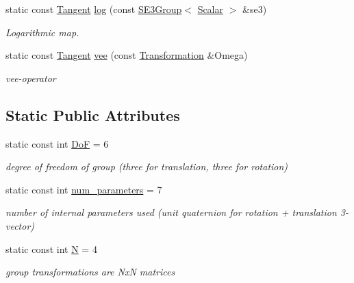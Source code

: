 \begin{DoxyCompactItemize}
static const \hyperlink{class_sophus_1_1_s_e3_group_base_a45f63b562f0614853cef2c04c4cd5f2b}{Tangent} \hyperlink{class_sophus_1_1_s_e3_group_base_a72dbbc415aacf31de17c3390c1b3ca6a}{log} (const \hyperlink{class_sophus_1_1_s_e3_group}{S\+E3\+Group}$<$ \hyperlink{class_sophus_1_1_s_e3_group_base_aa3db86a2cabe32d3c299dda41af181cc}{Scalar} $>$ \&se3)
\begin{DoxyCompactList}\small\item\em Logarithmic map. \end{DoxyCompactList}\item 
static const \hyperlink{class_sophus_1_1_s_e3_group_base_a45f63b562f0614853cef2c04c4cd5f2b}{Tangent} \hyperlink{class_sophus_1_1_s_e3_group_base_ab528f1cbb8bb3cc657d295d94fc6049e}{vee} (const \hyperlink{class_sophus_1_1_s_e3_group_base_a426ebd53f324a4fd6d36c28028f967f1}{Transformation} \&Omega)
\begin{DoxyCompactList}\small\item\em vee-\/operator \end{DoxyCompactList}\end{DoxyCompactItemize}
\subsection*{Static Public Attributes}
\begin{DoxyCompactItemize}
\item 
static const int \hyperlink{class_sophus_1_1_s_e3_group_base_a987f60dc0458e4cc0db2a81f02a09c4c}{DoF} = 6\hypertarget{class_sophus_1_1_s_e3_group_base_a987f60dc0458e4cc0db2a81f02a09c4c}{}\label{class_sophus_1_1_s_e3_group_base_a987f60dc0458e4cc0db2a81f02a09c4c}

\begin{DoxyCompactList}\small\item\em degree of freedom of group (three for translation, three for rotation) \end{DoxyCompactList}\item 
static const int \hyperlink{class_sophus_1_1_s_e3_group_base_ab0ddff1c417a469e12a4d620245ee079}{num\+\_\+parameters} = 7\hypertarget{class_sophus_1_1_s_e3_group_base_ab0ddff1c417a469e12a4d620245ee079}{}\label{class_sophus_1_1_s_e3_group_base_ab0ddff1c417a469e12a4d620245ee079}

\begin{DoxyCompactList}\small\item\em number of internal parameters used (unit quaternion for rotation + translation 3-\/vector) \end{DoxyCompactList}\item 
static const int \hyperlink{class_sophus_1_1_s_e3_group_base_a8dabd43a5742a8ea12b23b9b9272cd36}{N} = 4\hypertarget{class_sophus_1_1_s_e3_group_base_a8dabd43a5742a8ea12b23b9b9272cd36}{}\label{class_sophus_1_1_s_e3_group_base_a8dabd43a5742a8ea12b23b9b9272cd36}

\begin{DoxyCompactList}\small\item\em group transformations are NxN matrices \end{DoxyCompactList}\end{DoxyCompactItemize}


